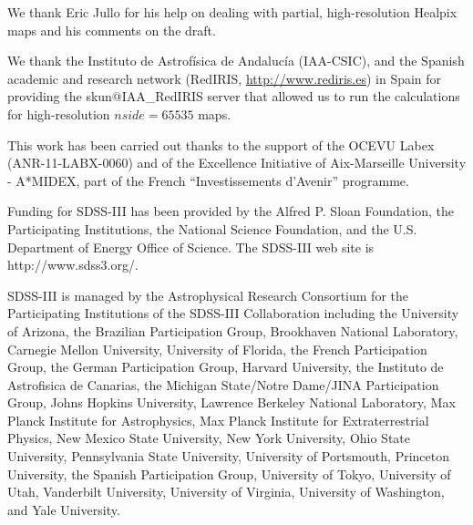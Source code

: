 \documentclass{aa}
\begin{document}
\begin{acknowledgements}
We thank Eric Jullo for his help on dealing with partial, high-resolution {\sc Healpix} maps and his comments on the draft. 

We thank the Instituto de Astrofísica de Andalucía (IAA-CSIC), and the Spanish academic and research network (RedIRIS, \url{http://www.rediris.es}) in Spain for providing the skun@IAA\_RedIRIS server that allowed us to run the calculations for high-resolution $nside=65535$ maps.

This work has been carried out thanks to the support of the OCEVU Labex (ANR-11-LABX-0060) and of the Excellence Initiative of Aix-Marseille University - A*MIDEX, part of the French “Investissements d’Avenir” programme. 

Funding for SDSS-III has been provided by the Alfred P. Sloan Foundation, the Participating Institutions, the National Science Foundation, and the U.S. Department of Energy Office of Science. The SDSS-III web site is http://www.sdss3.org/.

SDSS-III is managed by the Astrophysical Research Consortium for the Participating Institutions of the SDSS-III Collaboration including the University of Arizona, the Brazilian Participation Group, Brookhaven National Laboratory, Carnegie Mellon University, University of Florida, the French Participation Group, the German Participation Group, Harvard University, the Instituto de Astrofisica de Canarias, the Michigan State/Notre Dame/JINA Participation Group, Johns Hopkins University, Lawrence Berkeley National Laboratory, Max Planck Institute for Astrophysics, Max Planck Institute for Extraterrestrial Physics, New Mexico State University, New York University, Ohio State University, Pennsylvania State University, University of Portsmouth, Princeton University, the Spanish Participation Group, University of Tokyo, University of Utah, Vanderbilt University, University of Virginia, University of Washington, and Yale University.

\end{acknowledgements}


\end{document}
